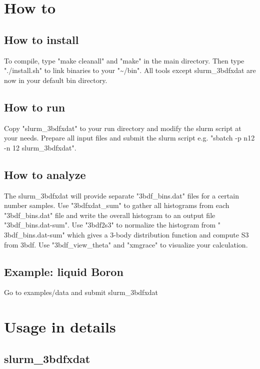 \documentclass[11pt]{article}
\begin{document}
\section{How to}
\label{sec:org6774adb}

\subsection{How to install}
\label{sec:org021ed54}
To compile, type "make cleanall" and "make" in the main directory.
Then type "./install.sh" to link binaries to your "\textasciitilde{}/bin".
All tools except slurm\_3bdfxdat are now in your default bin directory.

\subsection{How to run}
\label{sec:org3a90835}
Copy "slurm\_3bdfxdat" to your run directory and modify the slurm
script at your needs. Prepare all input files and submit the slurm
script e.g. "sbatch -p n12 -n 12 slurm\_3bdfxdat".

\subsection{How to analyze}
\label{sec:org50786a6}
The slurm\_3bdfxdat will provide separate "3bdf\_bins.dat" files for a
certain number samples. Use "3bdfxdat\_sum" to gather all histograms
from each "3bdf\_bins.dat" file and write the overall histogram to an
output file "3bdf\_bins.dat-sum". Use "3bdf2s3" to normalize the
histogram from " 3bdf\_bins.dat-sum" which gives a 3-body distribution
function and compute S3 from 3bdf. Use "3bdf\_view\_theta" and "xmgrace"
to visualize your calculation.

\subsection{Example: liquid Boron}
\label{sec:org10a535d}
Go to examples/data and submit slurm\_3bdfxdat

\section{Usage in details}
\label{sec:org1bb65f0}

\subsection{slurm\_3bdfxdat}
\label{sec:org341ca96}
\end{document}
